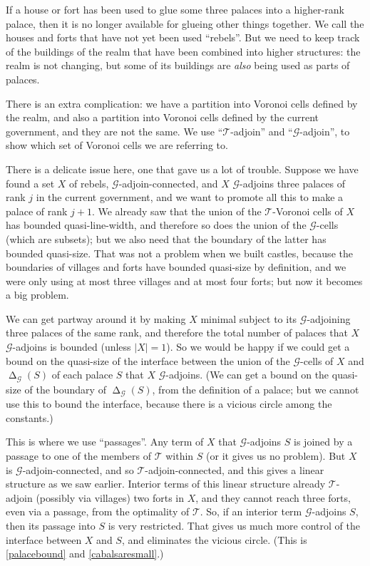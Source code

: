 \documentclass[titlepage,11pt]{article}
\newcommand{\voro}{\operatorname{\Delta}}
\newcommand{\mac}{\mathcal}
\begin{document}
	If a house or fort has been used to glue some three palaces into a higher-rank palace, then it is no longer available
	for glueing other things together. We call the houses and forts that have not yet been used ``rebels''. 
	But we need to keep track of the buildings of the realm that have been combined into higher structures: the realm is not changing,
	but some of its buildings 
	are {\em also} being used as parts of palaces. 
	
	There is an extra complication: we have a partition into Voronoi cells defined by 
	the realm, and also a partition into Voronoi cells defined by the current government, and they are not the same. We use 
	``$\mac T$-adjoin'' and ``$\mac G$-adjoin'', to show which set of Voronoi cells we are referring to.
	
	There is a delicate issue here, one that gave us a lot of trouble. Suppose we have found a set $X$ of rebels, 
	$\mac G$-adjoin-connected, 
	and $X$ $\mac G$-adjoins three palaces of rank $j$ in the current government, and we want to promote all this to make a palace of rank 
	$j+1$. We already saw that the union of the $\mac T$-Voronoi cells of $X$ has bounded quasi-line-width, and therefore so does 
	the union of the $\mac G$-cells (which are subsets); but we also need that the boundary of the latter
	has bounded quasi-size.
	That was not a problem when we built castles, because the boundaries of villages and forts have bounded 
	quasi-size by definition,  and we were only using at most three villages and at most four forts; but now it becomes a big problem.
	
	We can get partway around it by making $X$ minimal subject to its $\mac G$-adjoining three palaces of the same rank, and therefore 
	the total number of palaces that $X$ $\mac G$-adjoins is bounded (unless $|X|=1$). So we would be happy if we could get a bound on the quasi-size of the 
	interface
	between the union of the $\mac G$-cells of $X$ and $\voro_{\mac G}(S)$ of each palace $S$ that $X$ $\mac G$-adjoins. 
	(We can get a bound
	on the quasi-size of the boundary of $\voro_{\mac G}(S)$, from the definition of a palace; but we 
	cannot use this to bound the interface, because 
	there is a vicious circle among the constants.) 
	
	This is where we use ``passages''. 
	Any term of $X$ that $\mac G$-adjoins $S$ is joined by a passage to one of the members of $\mac T$
	within $S$ (or it gives us no problem). But $X$ is $\mac G$-adjoin-connected, and so $\mac T$-adjoin-connected, and this gives a 
	linear structure as we saw earlier.  
	Interior terms of this linear structure already $\mac T$-adjoin (possibly via villages) two forts in $X$, and they cannot reach 
	three forts, even via a passage, from the optimality of $\mac T$. So, if an interior term $\mac G$-adjoins $S$, then its passage into $S$ 
	is very restricted. That gives us much more control of 
	the interface between $X$ and $S$, and eliminates the vicious circle. (This is \ref{palacebound} and \ref{cabalsaresmall}.)
	
\end{document}
